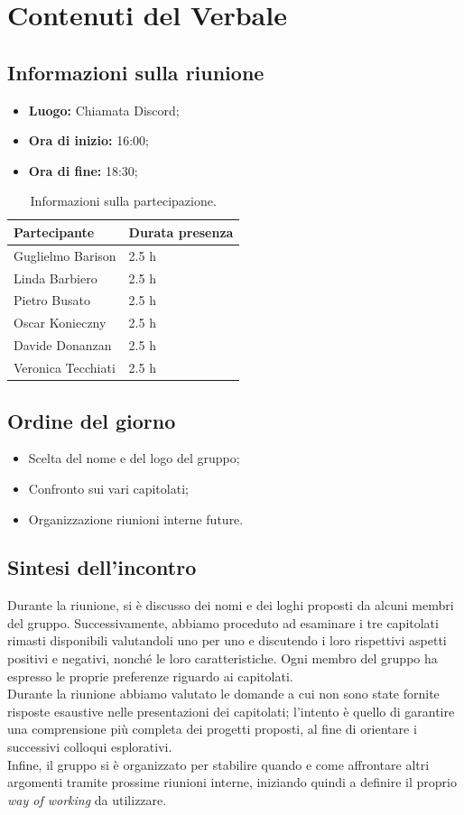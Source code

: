 \documentclass[8pt]{article}
\begin{document}
\section{Contenuti del Verbale}
\subsection{Informazioni sulla riunione}
\begin{itemize}
	\setlength\itemsep{0em}
	\item\textbf{Luogo:} Chiamata Discord;
	\item\textbf{Ora di inizio:} 16:00;
	\item\textbf{Ora di fine:}  18:30;
\end{itemize}
\begin{table}[ht!]
	\begin{tabular}{p{3cm} p{3cm}}
		\toprule
		\textbf{Partecipante} & \textbf{Durata presenza} \\
		\midrule
		Guglielmo Barison & 2.5 h \\
		Linda Barbiero &  2.5 h \\
		Pietro Busato & 2.5 h \\
		Oscar Konieczny & 2.5 h \\
		Davide Donanzan & 2.5 h \\
		Veronica Tecchiati & 2.5 h \\
		\bottomrule
	\end{tabular}
	\caption{Informazioni sulla partecipazione.}
	\label{table:Informazioni sulla partecipazione}
\end{table}
\subsection{Ordine del giorno}
\begin{itemize}
	\setlength\itemsep{0em}
	\item Scelta del nome e del logo del gruppo;	
	\item Confronto sui vari capitolati;
	\item Organizzazione riunioni interne future.
\end{itemize}
\subsection{Sintesi dell'incontro}
Durante la riunione, si è discusso dei nomi e dei loghi proposti da alcuni membri del gruppo. 
Successivamente, abbiamo proceduto ad esaminare i tre capitolati rimasti disponibili valutandoli uno per uno e discutendo i loro rispettivi aspetti positivi e negativi, nonché le loro caratteristiche. Ogni membro del gruppo ha espresso le proprie preferenze riguardo ai capitolati. \\
Durante la riunione abbiamo valutato le domande a cui non sono state fornite risposte esaustive nelle presentazioni dei capitolati; l'intento è quello di garantire una comprensione più completa dei progetti proposti, al fine di orientare i successivi colloqui esplorativi. \\
Infine, il gruppo si è organizzato per stabilire quando e come affrontare altri argomenti tramite prossime riunioni interne, iniziando quindi a definire il proprio \textit{way of working} da utilizzare.
\end{document}
